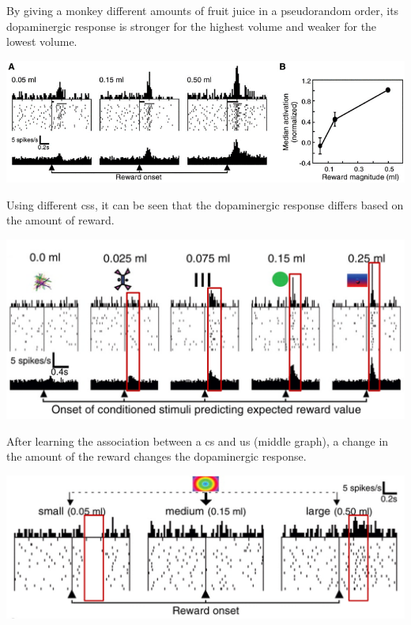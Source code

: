 \begin{description}
        \begin{casestudy}
            By giving a monkey different amounts of fruit juice in a pseudorandom order,
            its dopaminergic response is stronger for the highest volume and weaker for the lowest volume.
            \begin{center}
                \includegraphics[width=0.7\linewidth]{./img/dopamine_monkey3.png}    
            \end{center}
        \end{casestudy}

        \begin{casestudy}
            Using different \acp{cs}, it can be seen that the dopaminergic response differs based on the amount of reward.
            \begin{center}
                \includegraphics[width=0.55\linewidth]{./img/dopamine_expected.png}
            \end{center}
        \end{casestudy}

        \begin{casestudy}
            After learning the association between a \ac{cs} and \ac{us} (middle graph), a change in the amount of the reward changes the dopaminergic response.
            \begin{center}
                \includegraphics[width=0.6\linewidth]{./img/dopamine_expected2.png}
            \end{center}


\end{casestudy}
\end{description}
